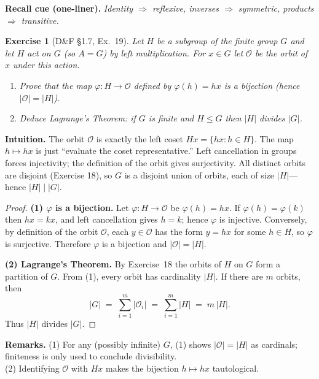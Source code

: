 \documentclass[12pt]{article}
\newtheorem{exercise}[theorem]{Exercise}
\theoremstyle{definition}
\begin{document}
\medskip
\noindent\textbf{Recall cue (one-liner).} \emph{Identity $\Rightarrow$ reflexive, inverses $\Rightarrow$ symmetric, products $\Rightarrow$ transitive.}

\newpage

\begin{exercise}[D\&F §1.7, Ex.~19]
Let $H$ be a subgroup of the finite group $G$ and let $H$ act on $G$ (so $A=G$) by left multiplication.
For $x\in G$ let $\mathcal{O}$ be the orbit of $x$ under this action.
\begin{enumerate}
\item Prove that the map $\varphi:H\to\mathcal{O}$ defined by $\varphi(h)=hx$ is a bijection (hence $|\mathcal{O}|=|H|$).
\item Deduce \emph{Lagrange’s Theorem}: if $G$ is finite and $H\le G$ then $|H|$ divides $|G|$.
\end{enumerate}
\end{exercise}

\dotfill

\noindent\textbf{Intuition.}
The orbit $\mathcal{O}$ is exactly the left coset $Hx=\{hx:h\in H\}$.
The map $h\mapsto hx$ is just “evaluate the coset representative.”
Left cancellation in groups forces injectivity; the definition of the orbit gives surjectivity.
All distinct orbits are disjoint (Exercise 18), so $G$ is a disjoint union of orbits, each of size $|H|$—hence $|H|\mid|G|$.

\dotfill

\begin{proof}
\textbf{(1) $\varphi$ is a bijection.}
Let $\varphi:H\to\mathcal{O}$ be $\varphi(h)=hx$.
If $\varphi(h)=\varphi(k)$ then $hx=kx$, and left cancellation gives $h=k$; hence $\varphi$ is injective.
Conversely, by definition of the orbit $\mathcal{O}$, each $y\in\mathcal{O}$ has the form $y=hx$ for some $h\in H$, so $\varphi$ is surjective.
Therefore $\varphi$ is a bijection and $|\mathcal{O}|=|H|$.

\smallskip
\textbf{(2) Lagrange’s Theorem.}
By Exercise~18 the orbits of $H$ on $G$ form a partition of $G$.
From (1), every orbit has cardinality $|H|$. If there are $m$ orbits, then
\[
|G| \;=\; \sum_{i=1}^{m} |\mathcal{O}_i| \;=\; \sum_{i=1}^{m} |H| \;=\; m\,|H|.
\]
Thus $|H|$ divides $|G|$.
\end{proof}

\noindent\textbf{Remarks.}
(1) For any (possibly infinite) $G$, (1) shows $|\mathcal{O}|=|H|$ as cardinals; finiteness is only used to conclude divisibility.\\
(2) Identifying $\mathcal{O}$ with $Hx$ makes the bijection $h\mapsto hx$ tautological.
\end{document}
